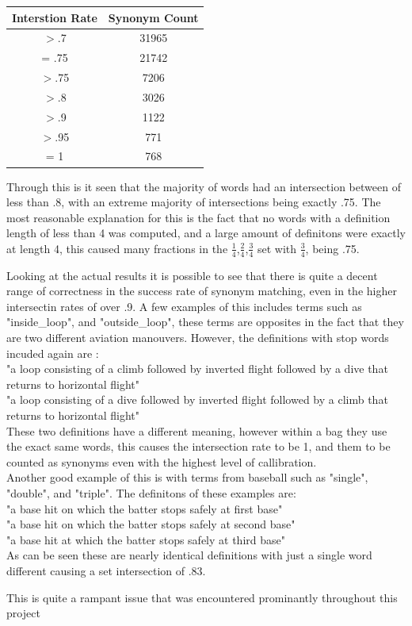 \documentclass{article}
\begin{document}
\begin{addmargin}[4em]{4em}
\begin{center}
 \begin{tabular}{||c | c||} 
 \hline
 Interstion Rate & Synonym Count \\ [0.5ex] 
 \hline\hline
$>$.7 & 31965 \\ 
 \hline
= .75 & 21742 \\
 \hline
$>$.75 & 7206 \\
 \hline
$>$.8 & 3026 \\
 \hline
$>$.9 & 1122 \\
 \hline
$>$.95 & 771 \\
 \hline
= 1 & 768 \\ [1ex] 
 \hline
\end{tabular}
\end{center}

Through this is it seen that the majority of words had an intersection between of less than .8, with an extreme majority of intersections being exactly .75. The most reasonable explanation for this is the fact that no words with a definition length of less than 4 was computed, and a large amount of definitons were exactly at length 4, this caused many fractions in the $\frac{1}{4}$,$\frac{2}{4}$,$\frac{3}{4}$ set with $\frac{3}{4}$, being .75.
\par Looking at the actual results it is possible to see that there is quite a decent range of correctness in the success rate of synonym matching, even in the higher intersectin rates of over .9. A few examples of this includes terms such as "inside\_loop", and "outside\_loop", these terms are opposites in the fact that they are two different aviation manouvers. However, the definitions with stop words incuded again are :
\\"a loop consisting of a climb followed by inverted flight followed by a dive that returns to horizontal flight"
\\"a loop consisting of a dive followed by inverted flight followed by a climb that returns to horizontal flight"
\\ These two definitions have a different meaning, however within a bag they use the exact same words, this causes the intersection rate to be 1, and them to be counted as synonyms even with the highest level of callibration.
\\ Another good example of this is with terms from baseball such as "single", "double", and  "triple". The definitons of these examples are:
\\"a base hit on which the batter stops safely at first base"
\\"a base hit on which the batter stops safely at second base"
\\"a base hit at which the batter stops safely at third base" 
\\As can be seen these are nearly identical definitions with just a single word different causing a set intersection of .83. 
\par This is quite a rampant issue that was encountered prominantly throughout this project
\end{addmargin}
\end{document}
